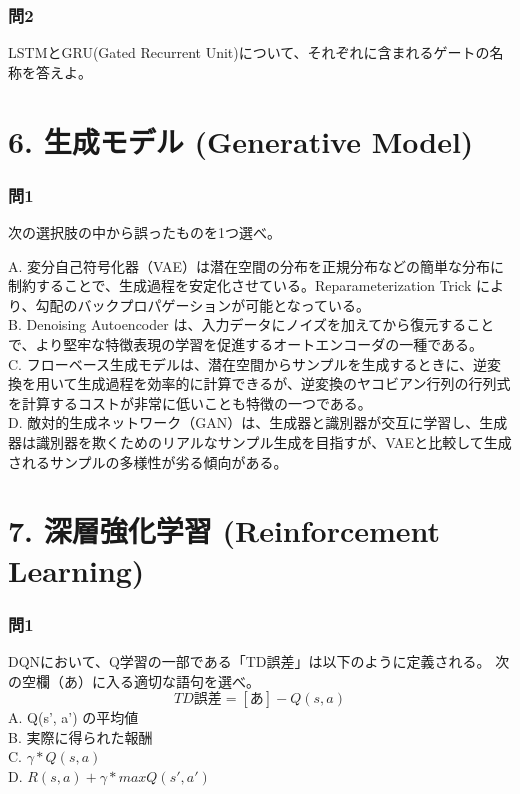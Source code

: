 \documentclass[
  letterpaper,
  DIV=11,
  numbers=noendperiod]{scrreprt}
\begin{document}
\subsection{問2}\label{ux554f2-3}

LSTMとGRU(Gated Recurrent
Unit)について、それぞれに含まれるゲートの名称を答えよ。

\chapter{6. 生成モデル (Generative
Model)}\label{ux751fux6210ux30e2ux30c7ux30eb-generative-model}

\subsection{問1}\label{ux554f1-7}

次の選択肢の中から誤ったものを1つ選べ。

A.
変分自己符号化器（VAE）は潜在空間の分布を正規分布などの簡単な分布に制約することで、生成過程を安定化させている。Reparameterization
Trick により、勾配のバックプロパゲーションが可能となっている。\\
B. Denoising Autoencoder
は、入力データにノイズを加えてから復元することで、より堅牢な特徴表現の学習を促進するオートエンコーダの一種である。\\
C.
フローベース生成モデルは、潜在空間からサンプルを生成するときに、逆変換を用いて生成過程を効率的に計算できるが、逆変換のヤコビアン行列の行列式を計算するコストが非常に低いことも特徴の一つである。\\
D.
敵対的生成ネットワーク（GAN）は、生成器と識別器が交互に学習し、生成器は識別器を欺くためのリアルなサンプル生成を目指すが、VAEと比較して生成されるサンプルの多様性が劣る傾向がある。

\chapter{7. 深層強化学習 (Reinforcement
Learning)}\label{ux6df1ux5c64ux5f37ux5316ux5b66ux7fd2-reinforcement-learning}

\subsection{問1}\label{ux554f1-8}

DQNにおいて、Q学習の一部である「TD誤差」は以下のように定義される。
次の空欄（あ）に入る適切な語句を選べ。 \[
TD誤差 = [あ] − Q(s, a)
\] A. Q(s', a') の平均値\\
B. 実際に得られた報酬\\
C. \({γ * Q(s, a)}\)\\
D. \({R(s, a) + γ * maxQ(s', a')}\)
\end{document}
